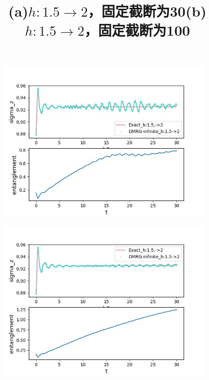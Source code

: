 \documentclass[12pt]{article}
\begin{document}
     \begin{figure}[H]
     	\centering
     	\begin{minipage}{0.49\linewidth}
     		\centering
     		\includegraphics[width=1\linewidth, height=230pt]{ee1}
     		\title{(a)$h:1.5\to2$，固定截断为30}
     		\label{fig:29}
     	\end{minipage}
     	\begin{minipage}{0.49\linewidth}
     		\centering
     		\includegraphics[width=1\linewidth, height=230pt]{ee2}
     		\title{(b)$h:1.5\to2$，固定截断为100}
     		\label{fig:30}
     	\end{minipage}
     	

\end{figure}
\end{document}
